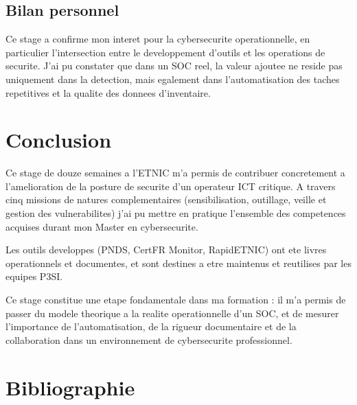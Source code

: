 \documentclass{rapport}
\begin{document}
\subsection{Bilan personnel}

Ce stage a confirme mon interet pour la cybersecurite operationnelle, en
particulier l'intersection entre le developpement d'outils et les
operations de securite. J'ai pu constater que dans un SOC reel, la valeur
ajoutee ne reside pas uniquement dans la detection, mais egalement dans
l'automatisation des taches repetitives et la qualite des donnees
d'inventaire.


\section{Conclusion}

Ce stage de douze semaines a l'ETNIC m'a permis de contribuer concretement
a l'amelioration de la posture de securite d'un operateur ICT critique. A
travers cinq missions de natures complementaires (sensibilisation, outillage,
veille et gestion des vulnerabilites) j'ai pu mettre en pratique l'ensemble
des competences acquises durant mon Master en cybersecurite.

Les outils developpes (PNDS, CertFR Monitor, RapidETNIC) ont ete livres
operationnels et documentes, et sont destines a etre maintenus et reutilises
par les equipes P3SI.

Ce stage constitue une etape fondamentale dans ma formation : il m'a permis
de passer du modele theorique a la realite operationnelle d'un SOC, et de
mesurer l'importance de l'automatisation, de la rigueur documentaire et de
la collaboration dans un environnement de cybersecurite professionnel.

\newpage
\section*{Bibliographie}
\end{document}
